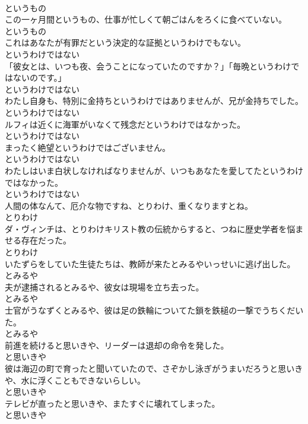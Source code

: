 \documentclass[8pt]{extreport}
\begin{document}
\begin{CJK}{UTF8}{min}
\\	というもの	
\\	この一ヶ月間というもの、仕事が忙しくて朝ごはんをろくに食べていない。	
\\	というもの	
\\	これはあなたが有罪だという決定的な証拠というわけでもない。	
\\	というわけではない	
\\	「彼女とは、いつも夜、会うことになっていたのですか？」「毎晩というわけではないのです。」	
\\	というわけではない	
\\	わたし自身も、特別に金持ちというわけではありませんが、兄が金持ちでした。	
\\	というわけではない	
\\	ルフィは近くに海軍がいなくて残念だというわけではなかった。	
\\	というわけではない	
\\	まったく絶望というわけではございません。	
\\	というわけではない	
\\	わたしはいま白状しなければなりませんが、いつもあなたを愛してたというわけではなかった。	
\\	というわけではない	
\\	人間の体なんて、厄介な物ですね、とりわけ、重くなりますとね。	
\\	とりわけ	
\\	ダ・ヴィンチは、とりわけキリスト教の伝統からすると、つねに歴史学者を悩ませる存在だった。	
\\	とりわけ	
\\	いたずらをしていた生徒たちは、教師が来たとみるやいっせいに逃げ出した。	
\\	とみるや	
\\	夫が逮捕されるとみるや、彼女は現場を立ち去った。	
\\	とみるや	
\\	士官がうなずくとみるや、彼は足の鉄輪についてた鎖を鉄槌の一撃でうちくだいた。	
\\	とみるや	
\\	前進を続けると思いきや、リーダーは退却の命令を発した。	
\\	と思いきや	
\\	彼は海辺の町で育ったと聞いていたので、さぞかし泳ぎがうまいだろうと思いきや、水に浮くこともできないらしい。	
\\	と思いきや	
\\	テレビが直ったと思いきや、またすぐに壊れてしまった。	
\\	と思いきや	

\end{CJK}
\end{document}
